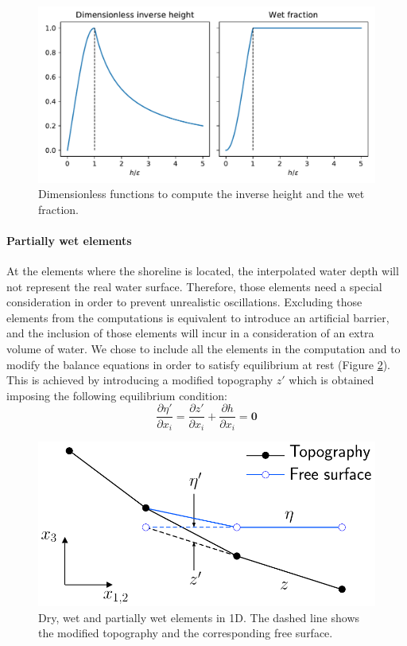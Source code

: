 \documentclass[a4paper,12pt]{elsarticle}
\newcommand{\pder}[2]{\frac{\partial#1}{\partial#2}}
\begin{document}
\begin{figure}
    \centering
    \includegraphics[width=\textwidth]{img/fig/inverse_height.pdf}
    \caption{Dimensionless functions to compute the  inverse height and the wet fraction.}
    \label{inverse_heihgt}
\end{figure}


\paragraph{Partially wet elements}
At the elements where the shoreline is located, the interpolated water depth will not represent the real water surface.
Therefore, those elements need a special consideration in order to prevent unrealistic oscillations. Excluding those elements from the computations is equivalent to introduce an artificial barrier, and the inclusion of those elements will incur in a consideration of an extra volume of water.
We chose to include all the elements in the computation and to modify the balance equations in order to satisfy equilibrium at rest (Figure \ref{partially_dry}). This is achieved by introducing a modified topography
$z'$ which is obtained imposing the following equilibrium condition:
\begin{equation}
    \pder{\eta'}{x_i} = \pder{z'}{x_i} + \pder{h}{x_i} = \mathbf{0}
\end{equation}

\begin{figure}
    \centering
    \includegraphics[width=.5\textwidth]{img/fig/partially_dry.pdf}
    \caption{Dry, wet and partially wet elements in 1D. The dashed line shows the modified topography  and the corresponding free surface.}
    \label{partially_dry}
\end{figure}
\end{document}
